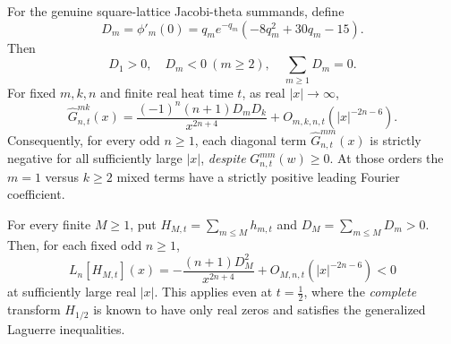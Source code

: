 \begin{theorem}
\label{thm:modepairsign}
For the genuine square-lattice Jacobi-theta summands,
define
\[
D_m=\phi'_m(0)
=q_me^{-q_m}(-8q_m^2+30q_m-15).
\]
Then
\begin{equation}
D_1>0,\quad D_m<0\ (m\ge2),\quad
\sum_{m\ge1}D_m=0.
\label{eq:modepairDs}
\end{equation}
For fixed \(m,k,n\) and finite real heat time \(t\),
as real \(|x|\to\infty\),
\begin{equation}
\boxed{\;
\widehat G^{mk}_{n,t}(x)
=\frac{(-1)^n(n+1)D_mD_k}{x^{2n+4}}
+O_{m,k,n,t}(|x|^{-2n-6}).
\;}
\label{eq:modepairasymptotic}
\end{equation}
Consequently, for every odd \(n\ge1\), each diagonal
term \(\widehat G^{mm}_{n,t}(x)\) is strictly negative
for all sufficiently large \(|x|\), \emph{despite}
\(G^{mm}_{n,t}(w)\ge0\). At those orders the
\(m=1\) versus \(k\ge2\) mixed terms have a
strictly positive leading Fourier coefficient.

For every finite \(M\ge1\), put
\(H_{M,t}=\sum_{m\le M}h_{m,t}\) and
\(D_M=\sum_{m\le M}D_m>0\).
Then, for each fixed odd \(n\ge1\),
\begin{equation}
\boxed{\;
L_n[H_{M,t}](x)=
-\frac{(n+1)D_M^2}{x^{2n+4}}
+O_{M,n,t}(|x|^{-2n-6})<0
\;}
\label{eq:finiteoddorders}
\end{equation}
at sufficiently large real \(|x|\).
This applies even at \(t=\frac12\), where the
\emph{complete} transform \(H_{1/2}\) is known
to have only real zeros and satisfies the
generalized Laguerre inequalities.
\end{theorem}

